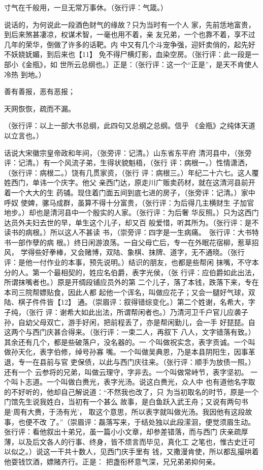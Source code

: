 \documentclass[UTF8,scheme=chinese,11pt,linespread=1.4]{ctexbook}
\makeatletter
\newenvironment{diben}[1]
  {\list{}{\listparindent 2em
    \itemindent\listparindent
    \rightmargin 0em  %
    \leftmargin 0em  %
    \parsep \z@ \@plus\p@}%
   \item\relax}
  {\endlist}
\makeatother
\begin{document}
\begin{diben}
三寸气在千般用，一旦无常万事休。（张行评：气箴。）

说话的，为何说此一段酒色财气的缘故？只为当时有一个人
家，先前恁地富贵，到后来煞甚凄凉，权谋术智，一毫也用不着，亲
友兄弟，一个也靠不着，享不过几年的荣华，倒做了许多的话靶。内
中又有几个斗宠争强，迎奸卖俏的，起先好不妖娆妩媚，到后来也【11】
免不得尸横灯影，血染空房。（张行评：此一段是一部小《金瓶》，如
世所云总纲也。）正是：（张行评：这一个“正是”，是天不肯使人冷热
到地。）

善有善报，恶有恶报；

天网恢恢，疏而不漏。

（张行评：以上一部大书总纲，此四句又总纲之总纲。信乎
《金瓶》之纯体天道以立言也。）

话说大宋徽宗皇帝政和年间，（张旁评：记清。）山东省东平府
清河县中，（张旁评：记清。）有一个风流子弟，生得状貌魁梧，（张行
评：病根一。）性情潇洒，（张行评：病根二。）饶有几贯家资，（张行
评：病根三。）年纪二十六七。这人覆姓西门，单讳一个庆字。他父
亲西门达，原走川广贩卖药材，就在这清河县前开着一个大大的生
药铺。现住着门面五间到底七进的房子，（张旁评：记清。）家中呼奴
使婢，骡马成群，虽算不得十分富贵，（张行评：为后得几主横财生
子加官地步。）却也是清河县中一个殷实的人家。（张行评：为后奢
华反照。）只为这西门达员外夫妇去世的早，单生这个儿子，却又百
般爱惜，听其所为。（张行评：是不读书的病根。）所以这人不甚读
书，（崇旁评：四字是一生病痛。　张行评：大书特书一部作孽的病
根。）终日闲游浪荡。一自父母亡后，专一在外眠花宿柳，惹草招风，
学得些好拳棒，又会赌博，双陆、象棋、抹牌、道字，无不通晓。（张行
评：是他一付作业的本事，预先说明。）结识的朋友，也都是些帮闲
抹嘴，不守本分的人。第一个最相契的，姓应名伯爵，表字光侯，（张
行评：应伯爵如此出法，所谓抹嘴者也。）原是开绸段铺应员外的第
二个儿子，落了本钱，跌落下来，专在本司三院帮嫖贴食，因此人都
起他一个诨名，叫做应花子；又会一腿好气球，双陆、棋子件件皆【12】
通。（崇眉评：叙得错综变化。）第二个姓谢，名希大，字子纯，（张行
评：谢希大如此出法，所谓帮闲者也。）乃清河卫千户官儿应袭子
孙，自幼父母双亡，游手好闲，把前程丢了，亦是帮闲勤儿，会一手
好琵琵。自这两个与西门庆甚合得来。（张行评：一束二人，再叙下
八人，文字错落有致。）其余还有几个，都是些破落户，没名器的。一
个叫做祝实念，表字贡诚。一个叫做孙天化，表字伯修，绰号孙寡
嘴。一个叫做吴典恩，乃是本县阴阳生，因事革退，专一在县前与官
吏保债，以此与西门庆往来。（张行评：顺手为放债一照。）还有一个
云参将的兄弟，叫做云理守，字非去。一个叫做常峙节，表字坚初。
一个叫卜志道。一个叫做白赉光，表字光汤。说这白赉光，众人中
也有道他名字取的不好听的，他却自己解说道：“不然我也改了，只
为当初取名的时节，原是一个门馆先生说我姓白，当初有一个甚么
故事，是白鱼跃入武王舟；又说有两句书是‘周有大赉，于汤有光’，
取这个意思，所以表字就叫做光汤。我因他有这段故事，也便不改
了。”（崇眉评：磊落写来，于结处独以此段潆洄，便觉须眉生动。
张行评：看他叙出十弟兄，虽一篇小小文章，却参差错落，而与西门
庆亲疏厚薄，以及后文各人的行事、终身，皆不烦言而毕见，真化工
之笔也，惟古史迁可以似之。）说这一干共十数人，见西门庆手里有
钱，又撒漫肯使，所以都乱撮哄着他耍钱饮酒，嫖赌齐行。正是：
把盏衔杯意气深，兄兄弟弟抑何亲。


\end{diben}
\end{document}

